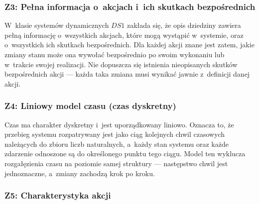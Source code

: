 \documentclass[12pt,a4paper]{article}
\begin{document}
\subsubsection*{Z3: Pełna informacja o~akcjach i~ich skutkach bezpośrednich}

W~klasie systemów dynamicznych $DS1$ zakłada się, że opis dziedziny zawiera pełną informację o~wszystkich akcjach, które mogą wystąpić w~systemie, oraz o~wszystkich ich skutkach bezpośrednich. Dla każdej akcji znane jest zatem, jakie zmiany stanu może ona wywołać bezpośrednio po swoim wykonaniu lub w~trakcie swojej realizacji. Nie dopuszcza się istnienia nieopisanych skutków bezpośrednich akcji — każda taka zmiana musi wynikać jawnie z~definicji danej akcji.

\subsubsection*{Z4: Liniowy model czasu (czas dyskretny)}

Czas ma charakter dyskretny i~jest uporządkowany liniowo. Oznacza to, że przebieg systemu rozpatrywany jest jako ciąg kolejnych chwil czasowych należących do zbioru liczb naturalnych, a~każdy stan systemu oraz każde zdarzenie odnoszone są do określonego punktu tego ciągu. Model ten wyklucza rozgałęzienia czasu na poziomie samej struktury — następstwo chwil jest jednoznaczne, a~zmiany zachodzą krok po kroku.






\subsubsection*{Z5: Charakterystyka akcji}
\end{document}
